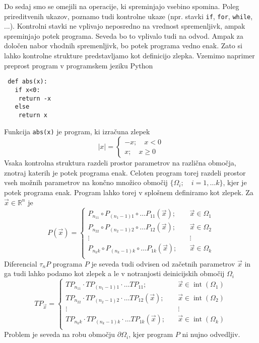 \documentclass{article}
\newcommand{\RR}{\mathbb{R}}
\newcommand{\sumd}{\tau}
\DeclareMathOperator{\interior}{int}
\begin{document}
 Do sedaj smo se omejili na operacije, ki spreminjajo vsebino spomina. Poleg
 prireditvenih ukazov, poznamo tudi kontrolne ukaze (npr. stavki \texttt{if},
 \texttt{for}, \texttt{while}, ...). Kontrolni stavki ne vplivajo neposredno na
 vrednost spremenljivk, ampak spreminjajo potek programa. Seveda bo to vplivalo
 tudi na odvod. Ampak za določen nabor vhodnih spremenljivk, bo potek programa
 vedno enak. Zato si lahko kontrolne strukture predstavljamo kot definicijo
 zlepka. Vzemimo naprimer preprost program v programskem jeziku Python
 \begin{verbatim}
 def abs(x):
   if x<0:
    return -x
   else
    return x
 \end{verbatim}
 Funkcija \texttt{abs(x)} je program, ki izračuna zlepek
 \begin{equation}
   \label{eq:zlepek}
   |x| =
   \begin{cases}
     -x;\quad x<0\\
     x;\quad x\ge 0
   \end{cases}
 \end{equation}
 Vsaka kontrolna struktura razdeli prostor parametrov na različna območja,
 znotraj katerih je potek programa enak. Celoten program torej razdeli prostor
 vseh možnih parametrov na končno množico območij $\{\Omega_i;\quad i=1,\ldots
 k\}$, kjer je potek programa enak. Program lahko torej v splošnem definiramo kot
 zlepek. Za $\vec{x}\in\RR^n$ je
 \begin{equation}
   \label{eq:zlrprk_splosno}
   P(\vec{x}) =
   \begin{cases}
     P_{n_11}\circ P_{(n_1-1)1}\circ\ldots P_{11}(\vec{x});&\quad \vec{x}\in\Omega_1\\
     P_{n_22}\circ P_{(n_2-1)2}\circ\ldots P_{12}(\vec{x});&\quad \vec{x}\in\Omega_2\\
     \vdots&\quad\vdots\\
     P_{n_kk}\circ P_{(n_k-1)k}\circ\ldots P_{1k}(\vec{x});&\quad \vec{x}\in\Omega_k\\
   \end{cases}
 \end{equation}
 Diferencial $\sumd_nP$ programa $P$ je seveda tudi odvisen od začetnih parametrov
 $\vec{x}$ in ga tudi lahko podamo kot zlepek a le v notranjosti deinicijskih območij $\Omega_i$
 \begin{equation}
   \label{eq:Dzlrprk_splosno}
   TP_{\vec{x}} =
   \begin{cases}
     TP_{n_11}\cdot TP_{(n_1-1)1}\cdot\ldots TP_{11};&\quad \vec{x}\in\interior(\Omega_1)\\
     TP_{n_22}\cdot TP_{(n_2-1)2}\cdot\ldots TP_{12}(\vec{x});&\quad \vec{x}\in\interior(\Omega_2)\\
     \vdots&\quad\vdots\\
     TP_{n_kk}\cdot TP_{(n_k-1)k}\cdot\ldots TP_{1k}(\vec{x});&\quad \vec{x}\in\interior(\Omega_k)\\
   \end{cases}
 \end{equation}
 Problem je seveda na robu območju $\partial\Omega_i$, kjer program $P$ ni nujno odvedljiv.
\end{document}
